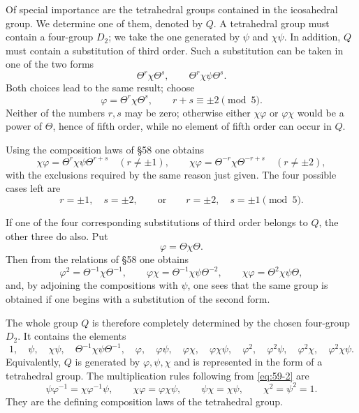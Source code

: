 \documentclass[11pt,a4paper]{article}
\begin{document}
Of special importance are the tetrahedral groups contained in the icosahedral group.  We determine one of them, denoted by \(Q\).  A tetrahedral group must contain a four-group \(D_2\); we take the one generated by \(\psi\) and \(\chi\psi\).  In addition, \(Q\) must contain a substitution of third order.  Such a substitution can be taken in one of the two forms
\[
 \Theta^r\chi\Theta^s,
 \qquad \Theta^r\chi\psi\Theta^s.
\]
Both choices lead to the same result; choose
\begin{equation}\label{eq:59-1}
 \varphi=\Theta^r\chi\Theta^s,
 \qquad r+s\equiv\pm2\pmod5.
\end{equation}
Neither of the numbers \(r,s\) may be zero; otherwise either \(\chi\varphi\) or \(\varphi\chi\) would be a power of \(\Theta\), hence of fifth order, while no element of fifth order can occur in \(Q\).

Using the composition laws of \S 58 one obtains
\[
 \chi\varphi=\Theta^r\chi\psi\Theta^{r+s}
 \quad (r\ne\pm1),
 \qquad
 \chi\varphi=\Theta^{-r}\chi\Theta^{-r+s}
 \quad (r\ne\pm2),
\]
with the exclusions required by the same reason just given.  The four possible cases left are
\[
 r=\pm1,
 \quad s=\pm2,
 \qquad\text{or}\qquad
 r=\pm2,
 \quad s=\pm1
 \pmod5.
\]

If one of the four corresponding substitutions of third order belongs to \(Q\), the other three do also.  Put
\begin{equation}\label{eq:59-2}
 \varphi=\Theta\chi\Theta.
\end{equation}
Then from the relations of \S 58 one obtains
\begin{equation}\label{eq:59-3}
 \varphi^2=\Theta^{-1}\chi\Theta^{-1},
 \qquad
 \varphi\chi=\Theta^{-1}\chi\psi\Theta^{-2},
 \qquad
 \chi\varphi=\Theta^2\chi\psi\Theta,
\end{equation}
and, by adjoining the compositions with \(\psi\), one sees that the same group is obtained if one begins with a substitution of the second form.

The whole group \(Q\) is therefore completely determined by the chosen four-group \(D_2\).  It contains the elements
\begin{equation}\label{eq:59-4}
 1,
 \quad \psi,
 \quad \chi\psi,
 \quad \Theta^{-1}\chi\psi\Theta^{-1},
 \quad \varphi,
 \quad \varphi\psi,
 \quad \varphi\chi,
 \quad \varphi\chi\psi,
 \quad \varphi^2,
 \quad \varphi^2\psi,
 \quad \varphi^2\chi,
 \quad \varphi^2\chi\psi.
\end{equation}
Equivalently, \(Q\) is generated by \(\varphi,\psi,\chi\) and is represented in the form of a tetrahedral group.  The multiplication rules following from \eqref{eq:59-2} are
\begin{equation}\label{eq:59-5}
 \psi\varphi^{-1}=\chi\varphi^{-1}\psi,
 \qquad
 \chi\varphi=\varphi\chi\psi,
 \qquad
 \psi\chi=\chi\psi,
 \qquad
 \chi^2=\psi^2=1.
\end{equation}
They are the defining composition laws of the tetrahedral group.
\end{document}
